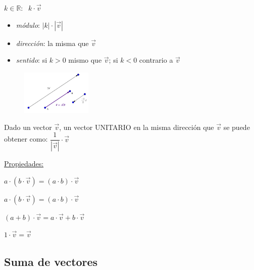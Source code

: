$k \in \mathbb{R}$: $\ \ k\cdot \vec v$
\begin{multicols}{2}				
\begin{itemize}
	\item \textit{módulo}: $|k|\cdot |\vec v|$
	\vspace{-2mm}\item \textit{dirección}: la misma que $\vec v$
	\vspace{-2mm}\item \textit{sentido}: si $k>0$ mismo que $\vec v$; si $k<0$ contrario a $\vec v$
\end{itemize} 
\begin{figure}[H]
		\centering
		\includegraphics[width=0.3\textwidth]{imagenes/imagenescv/T10IM02.png}
\end{figure}
\end{multicols}


Dado un vector $\vec v$, un vector UNITARIO en la misma dirección que $\vec v$ se puede obtener como: $\dfrac 1 {|\vec v|}\cdot \vec v$

\vspace{4mm}

\underline{Propiedades:} 

\begin{itemize}
\begin{multicols}{2}
	\item $a\cdot (b\cdot \vec v)=(a\cdot b)\cdot \vec v$ 
	\item  $a\cdot (b\cdot \vec v)=(a\cdot b)\cdot \vec v$ 
	\item $(a+b)\cdot \vec v=a\cdot \vec v+ b\cdot \vec v  $
	\item $1\cdot \vec v=\vec v$
\end{multicols}
\end{itemize}

\subsection{Suma de vectores}

